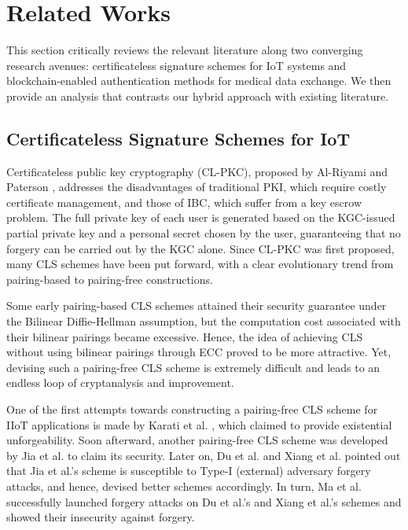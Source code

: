 \documentclass[conference]{IEEEtran}
\begin{document}
\section{Related Works}

This section critically reviews the relevant literature along two converging research avenues: certificateless signature schemes for IoT systems and blockchain-enabled authentication methods for medical data exchange. We then provide an analysis that contrasts our hybrid approach with existing literature.

\subsection{Certificateless Signature Schemes for IoT}

Certificateless public key cryptography (CL-PKC), proposed by Al-Riyami and Paterson \cite{ref18}, addresses the disadvantages of traditional PKI, which require costly certificate management, and those of IBC, which suffer from a key escrow problem. The full private key of each user is generated based on the KGC-issued partial private key and a personal secret chosen by the user, guaranteeing that no forgery can be carried out by the KGC alone. Since CL-PKC was first proposed, many CLS schemes have been put forward, with a clear evolutionary trend from pairing-based to pairing-free constructions.

Some early pairing-based CLS schemes \cite{ref19,ref20} attained their security guarantee under the Bilinear Diffie-Hellman assumption, but the computation cost associated with their bilinear pairings became excessive. Hence, the idea of achieving CLS without using bilinear pairings through ECC proved to be more attractive. Yet, devising such a pairing-free CLS scheme is extremely difficult and leads to an endless loop of cryptanalysis and improvement.

One of the first attempts towards constructing a pairing-free CLS scheme for IIoT applications is made by Karati et al. \cite{ref20}, which claimed to provide existential unforgeability. Soon afterward, another pairing-free CLS scheme was developed by Jia et al. \cite{ref21} to claim its security. Later on, Du et al. \cite{ref23} and Xiang et al. \cite{ref24} pointed out that Jia et al.'s scheme is susceptible to Type-I (external) adversary forgery attacks, and hence, devised better schemes accordingly. In turn, Ma et al. \cite{ref22} successfully launched forgery attacks on Du et al.'s and Xiang et al.'s schemes and showed their insecurity against forgery.
\end{document}
